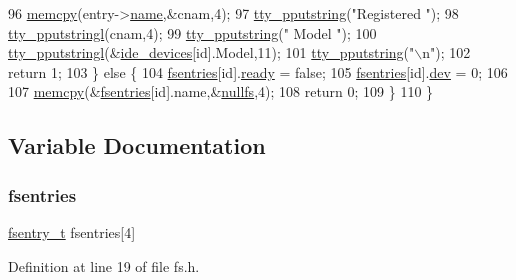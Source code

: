 \begin{DoxyCode}
96         \hyperlink{a00131_a370712322c794e949c996946f2283ea8_a370712322c794e949c996946f2283ea8}{memcpy}(entry->\hyperlink{a00272_a9c5a4f5b02eb2c9e9e797f79dc99028a_a9c5a4f5b02eb2c9e9e797f79dc99028a}{name},&cnam,4);
97         \hyperlink{a00179_ade960b1320324706aac6c00cc6b1b2fe_ade960b1320324706aac6c00cc6b1b2fe}{tty\_pputstring}(\textcolor{stringliteral}{"Registered "});
98         \hyperlink{a00179_abaf93f9e56ddb7b10462070f59e534e4_abaf93f9e56ddb7b10462070f59e534e4}{tty\_pputstringl}(cnam,4);
99         \hyperlink{a00179_ade960b1320324706aac6c00cc6b1b2fe_ade960b1320324706aac6c00cc6b1b2fe}{tty\_pputstring}(\textcolor{stringliteral}{" Model "});
100         \hyperlink{a00179_abaf93f9e56ddb7b10462070f59e534e4_abaf93f9e56ddb7b10462070f59e534e4}{tty\_pputstringl}(&\hyperlink{a00035_ab97a828ed4839b575dc382e2bf826e87_ab97a828ed4839b575dc382e2bf826e87}{ide\_devices}[\textcolor{keywordtype}{id}].Model,11);
101         \hyperlink{a00179_ade960b1320324706aac6c00cc6b1b2fe_ade960b1320324706aac6c00cc6b1b2fe}{tty\_pputstring}(\textcolor{stringliteral}{"\(\backslash\)n"});
102         \textcolor{keywordflow}{return} 1;
103     \} \textcolor{keywordflow}{else} \{
104         \hyperlink{a00152_a6b46131164b26e476762930c9aae4319_a6b46131164b26e476762930c9aae4319}{fsentries}[id].\hyperlink{a00272_a284522ed97fe1eeebd0fcc039b2ea00a_a284522ed97fe1eeebd0fcc039b2ea00a}{ready} = \textcolor{keyword}{false};
105         \hyperlink{a00152_a6b46131164b26e476762930c9aae4319_a6b46131164b26e476762930c9aae4319}{fsentries}[id].\hyperlink{a00272_aaea66ea744fa50f1c54666033884d8d2_aaea66ea744fa50f1c54666033884d8d2}{dev} = 0;
106 
107         \hyperlink{a00131_a370712322c794e949c996946f2283ea8_a370712322c794e949c996946f2283ea8}{memcpy}(&\hyperlink{a00152_a6b46131164b26e476762930c9aae4319_a6b46131164b26e476762930c9aae4319}{fsentries}[\textcolor{keywordtype}{id}].name,&\hyperlink{a00149_a36265ac74fd925405e1179e799961f1e_a36265ac74fd925405e1179e799961f1e}{nullfs},4);
108         \textcolor{keywordflow}{return} 0;
109     \} 
110 \}
\end{DoxyCode}


\subsection{Variable Documentation}
\mbox{\label{a00152_a6b46131164b26e476762930c9aae4319_a6b46131164b26e476762930c9aae4319}} 
\subsubsection{\texorpdfstring{fsentries}{fsentries}}
{\footnotesize\ttfamily \hyperlink{a00152_a9ccf6560e8aebea3e4402a31e8c0f46b_a9ccf6560e8aebea3e4402a31e8c0f46b}{fsentry\+\_\+t} fsentries\mbox{[}4\mbox{]}}



Definition at line 19 of file fs.\+h.

